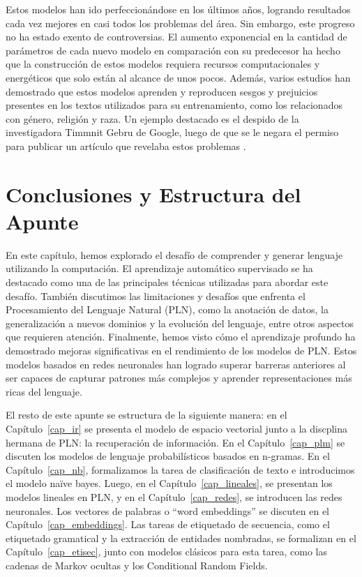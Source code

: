 Estos modelos han ido perfeccionándose en los últimos años, logrando resultados cada vez mejores en casi todos los problemas del área. Sin embargo, este progreso no ha estado exento de controversias. El aumento exponencial en la cantidad de parámetros de cada nuevo modelo en comparación con su predecesor ha hecho que la construcción de estos modelos requiera recursos computacionales y energéticos que solo están al alcance de unos pocos. Además, varios estudios han demostrado que estos modelos aprenden y reproducen sesgos y prejuicios presentes en los textos utilizados para su entrenamiento, como los relacionados con género, religión y raza. Un ejemplo destacado es el despido de la investigadora Timmnit Gebru de Google, luego de que se le negara el permiso para publicar un artículo que revelaba estos problemas \cite{bender2021dangers}.



\section{Conclusiones y Estructura del Apunte}
En este capítulo, hemos explorado el desafío de comprender y generar lenguaje utilizando la computación. El aprendizaje automático supervisado se ha destacado como una de las principales técnicas utilizadas para abordar este desafío. También discutimos las limitaciones y desafíos que enfrenta el Procesamiento del Lenguaje Natural (PLN), como la anotación de datos, la generalización a nuevos dominios y la evolución del lenguaje, entre otros aspectos que requieren atención. Finalmente, hemos visto cómo el aprendizaje profundo ha demostrado mejoras significativas en el rendimiento de los modelos de PLN. Estos modelos basados en redes neuronales han logrado superar barreras anteriores al ser capaces de capturar patrones más complejos y aprender representaciones más ricas del lenguaje.

El resto de este apunte se estructura de la siguiente manera: en el Capítulo~\ref{cap_ir} se presenta el modelo de espacio vectorial junto a la discplina hermana de PLN: la recuperación de información. En el Capítulo~\ref{cap_plm} se discuten los modelos de lenguaje probabilísticos basados en n-gramas. En el Capítulo~\ref{cap_nb}, formalizamos la tarea de clasificación de texto e introducimos el modelo naïve bayes. Luego, en el Capítulo~\ref{cap_lineales}, se presentan los modelos lineales en PLN, y en el Capítulo~\ref{cap_redes}, se introducen las redes neuronales. Los vectores de palabras o ``word embeddings'' se discuten en el Capítulo~\ref{cap_embeddings}. Las tareas de etiquetado de secuencia, como el etiquetado gramatical y la extracción de entidades nombradas, se formalizan en el Capítulo~\ref{cap_etisec}, junto con modelos clásicos para esta tarea, como las cadenas de Markov ocultas y los Conditional Random Fields.

